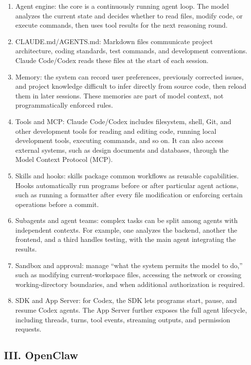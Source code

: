 \begin{enumerate}
\def\labelenumi{\arabic{enumi}.}
\item
  Agent engine: the core is a continuously running agent loop. The model analyzes the current state and decides whether to read files, modify code, or execute commands, then uses tool results for the next reasoning round.
\item
  CLAUDE.md/AGENTS.md: Markdown files communicate project architecture, coding standards, test commands, and development conventions. Claude Code/Codex reads these files at the start of each session.
\item
  Memory: the system can record user preferences, previously corrected issues, and project knowledge difficult to infer directly from source code, then reload them in later sessions. These memories are part of model context, not programmatically enforced rules.
\item
  Tools and MCP: Claude Code/Codex includes filesystem, shell, Git, and other development tools for reading and editing code, running local development tools, executing commands, and so on. It can also access external systems, such as design documents and databases, through the Model Context Protocol (MCP).
\item
  Skills and hooks: skills package common workflows as reusable capabilities. Hooks automatically run programs before or after particular agent actions, such as running a formatter after every file modification or enforcing certain operations before a commit.
\item
  Subagents and agent teams: complex tasks can be split among agents with independent contexts. For example, one analyzes the backend, another the frontend, and a third handles testing, with the main agent integrating the results.
\item
  Sandbox and approval: manage ``what the system permits the model to do,'' such as modifying current-workspace files, accessing the network or crossing working-directory boundaries, and when additional authorization is required.
\item
  SDK and App Server: for Codex, the SDK lets programs start, pause, and resume Codex agents. The App Server further exposes the full agent lifecycle, including threads, turns, tool events, streaming outputs, and permission requests.
\end{enumerate}

\hypertarget{iii.-openclaw}{%
\subsection{III. OpenClaw}\label{iii.-openclaw}}

